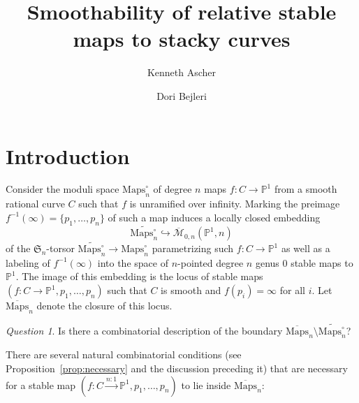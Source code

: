 \documentclass[11pt]{amsart}
\title{Smoothability of relative stable maps to stacky curves}
\author{Kenneth Ascher}
\author{Dori Bejleri}
\numberwithin{equation}{section}
\theoremstyle{definition}
\theoremstyle{remark}
\newtheorem{question}{Question}
\newcommand{\bP}{{\mathbb P}}
\newcommand{\maps}{\overline{\mathcal{M}}_{0,n}(\bP^1, n)}
\newcommand{\mapso}{\mathrm{Maps}^\circ_n}
\newcommand{\mapsc}{\overline{\mathrm{Maps}}_n}
\begin{document}

\maketitle

\begin{prelims}

\DisplayAbstractInEnglish

\bigskip

\DisplayKeyWords

\medskip

\DisplayMSCclass


\end{prelims}



\newpage

\setcounter{tocdepth}{1}

\tableofcontents



\section{Introduction}

Consider the moduli space $\mapso$ of degree $n$ maps $f\colon C \to \mathbb{P}^1$ 
from a smooth rational curve $C$ such that $f$ is unramified over infinity. Marking the preimage $f^{-1}(\infty) = \{p_1, \ldots, p_n\}$ of such a map induces a locally closed embedding 
\[
\widetilde{\mapso} \hookrightarrow \maps
\]
of the $\mathfrak{S}_n$-torsor $\widetilde{\mapso} \to \mapso$ parametrizing such $f \colon C \to \mathbb{P}^1$ as well as a labeling of $f^{-1}(\infty)$ into the space of $n$-pointed degree $n$ genus $0$ stable maps to $\mathbb{P}^1$. The image of this embedding is the locus of stable maps $(f \colon C \to \mathbb{P}^1, p_1, \ldots, p_n)$ such that $C$ is smooth and $f(p_i) = \infty$ for all $i$. Let $\mapsc$ denote the closure of this locus. 

\begin{question}\label{q1} Is there a combinatorial description of the boundary $\mapsc \setminus \widetilde{\mapso}$? 
\end{question}

There are several natural combinatorial conditions (see Proposition~\ref{prop:necessary} and the discussion preceding it) that are necessary for a stable map $(f \colon C \xrightarrow{n:1} \mathbb{P}^1, p_1, \ldots, p_n)$ to lie inside $\mapsc$:
\end{document}
